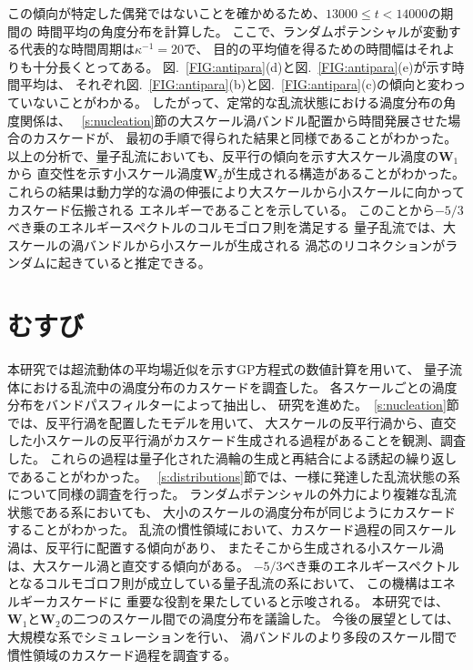 \documentclass[12pt,a4paper]{jbook}
\begin{document}
			この傾向が特定した偶発ではないことを確かめるため、$13000 \leq t  < 14000$の期間の
			時間平均の角度分布を計算した。
			ここで、ランダムポテンシャルが変動する代表的な時間周期は$\kappa^{-1}=20$で、
			目的の平均値を得るための時間幅はそれよりも十分長くとってある。
			図.~\ref{FIG:antipara}(d)と図.~\ref{FIG:antipara}(e)が示す時間平均は、
			それぞれ図.~\ref{FIG:antipara}(b)と図.~\ref{FIG:antipara}(c)の傾向と変わっていないことがわかる。
			したがって、定常的な乱流状態における渦度分布の角度関係は、
            ~\ref{s:nucleation}節の大スケール渦バンドル配置から時間発展させた場合のカスケードが、
            最初の手順で得られた結果と同様であることがわかった。
			以上の分析で、量子乱流においても、反平行の傾向を示す大スケール渦度の$\bm{W}_1$から
			直交性を示す小スケール渦度$\bm{W}_2$が生成される構造があることがわかった。
			これらの結果は動力学的な渦の伸張により大スケールから小スケールに向かってカスケード伝搬される
			エネルギーであることを示している。
			このことから$-5/3$べき乗のエネルギースペクトルのコルモゴロフ則を満足する
            量子乱流では、大スケールの渦バンドルから小スケールが生成される
            渦芯のリコネクションがランダムに起きていると推定できる。


		\section{むすび}
		\label{s:conclusions}
		本研究では超流動体の平均場近似を示すGP方程式の数値計算を用いて、
        量子流体における乱流中の渦度分布のカスケードを調査した。
        各スケールごとの渦度分布をバンドパスフィルターによって抽出し、
		研究を進めた。~\ref{s:nucleation}節では、反平行渦を配置したモデルを用いて、
		大スケールの反平行渦から、直交した小スケールの反平行渦がカスケード生成される過程があることを観測、調査した。
		これらの過程は量子化された渦輪の生成と再結合による誘起の繰り返しであることがわかった。
		~\ref{s:distributions}節では、一様に発達した乱流状態の系について同様の調査を行った。
		ランダムポテンシャルの外力により複雑な乱流状態である系においても、
        大小のスケールの渦度分布が同じようにカスケードすることがわかった。
		乱流の慣性領域において、カスケード過程の同スケール渦は、反平行に配置する傾向があり、
		またそこから生成される小スケール渦は、大スケール渦と直交する傾向がある。
		$-5/3$べき乗のエネルギースペクトルとなるコルモゴロフ則が成立している量子乱流の系において、
        この機構はエネルギーカスケードに
		重要な役割を果たしていると示唆される。
		本研究では、$\bm{W}_1$と$\bm{W}_2$の二つのスケール間での渦度分布を議論した。
		今後の展望としては、大規模な系でシミュレーションを行い、
		渦バンドルのより多段のスケール間で慣性領域のカスケード過程を調査する。
\end{document}
